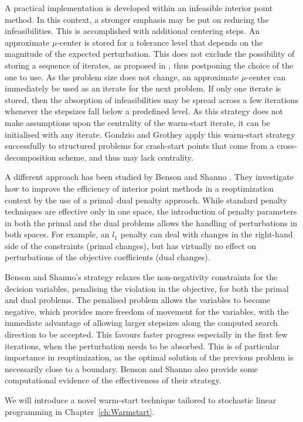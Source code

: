 A practical implementation is developed within an infeasible interior 
point method. In this context, a stronger emphasis may be put on 
reducing the infeasibilities. This is accomplished with additional 
centering steps.
An approximate $\mu$-center is stored for a tolerance level that 
depends on the magnitude of the expected perturbation. This does not 
exclude the possibility of storing a sequence of iterates, as proposed 
in \cite{YildirimWright}, thus postponing the choice of the one to 
use.
As the problem size does not change, an approximate $\mu$-center 
can immediately be used as an iterate for the next problem.
If only one iterate is stored, then the absorption of infeasibilities 
may be spread across a few iterations whenever the stepsizes fall 
below a predefined level.
As this strategy does not make assumptions upon the centrality of the 
warm-start iterate,
it can be initialised with any iterate.
Gondzio and Grothey \cite{GondzioGrothey03} apply this warm-start 
strategy successfully to structured problems for crash-start points that 
come from a cross-decomposition scheme, and thus may lack centrality.

A different approach has been studied by Benson and Shanno 
\cite{BensonShanno}. They investigate how to improve the efficiency 
of interior point methods in a reoptimization context by the use of 
a primal--dual penalty approach.
While standard penalty techniques are effective only in one space, 
the introduction of penalty parameters in both the primal and the 
dual problems allows the handling of perturbations in both spaces.
For example, an $l_1$ penalty can deal with changes in the right-hand
side of the constraints (primal changes), but has virtually no effect
on perturbations of the objective coefficients (dual changes).

Benson and Shanno's strategy relaxes the non-negativity constraints
for the decision
variables, penalising the violation in the objective, for both
the primal and dual problems.
The penalised problem allows the variables to become negative,
which provides more freedom of movement for the variables, with
the immediate advantage of allowing larger stepsizes along 
the computed search direction to be accepted. This favours faster progress
especially in the first few iterations, when the perturbation needs
to be absorbed.
This is of particular importance in reoptimization, as the optimal
solution of the previous problem is necessarily close to a boundary.
Benson and Shanno \cite{BensonShanno} also provide some computational
evidence of the effectiveness of their strategy.

We will introduce a novel warm-start technique tailored to stochastic
linear programming in Chapter~\ref{ch:Warmstart}.
